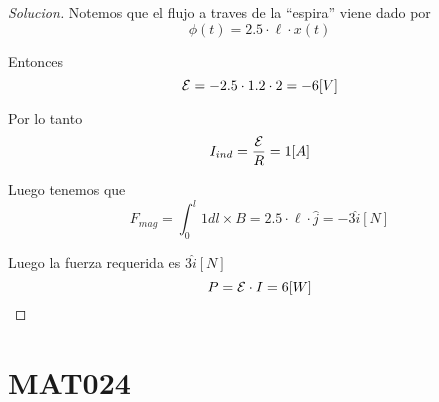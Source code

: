 \documentclass{article}
\theoremstyle{definition}
\newenvironment{solution}{\begin{proof}[Solucion]}{\end{proof}}
\begin{document}
\begin{solution}
  Notemos que el flujo a traves de la ``espira'' viene dado por
  \begin{equation*}
    \phi(t) = 2.5 \cdot \ell \cdot x(t)
  \end{equation*}

  Entonces
  \begin{equation*}
    \mathcal{E} = -2.5 \cdot 1.2 \cdot 2 = -6 [V]
  \end{equation*}

  Por lo tanto
  \begin{equation*}
    I_{ind} = \frac{\mathcal{E}}{R} = 1 [A]
  \end{equation*}

  Luego tenemos que
  \begin{equation*}
    F_{mag} = \int_{0}^{l} 1 dl \times B = 2.5 \cdot \ell \cdot \hat{j} = -3 \hat{i} [N]
  \end{equation*}

  Luego la fuerza requerida es $3 \hat{i} [N]$
  \begin{equation*}
    P = \mathcal{E} \cdot I = 6 [W]
  \end{equation*}
\end{solution}

\section{MAT024}
\end{document}
